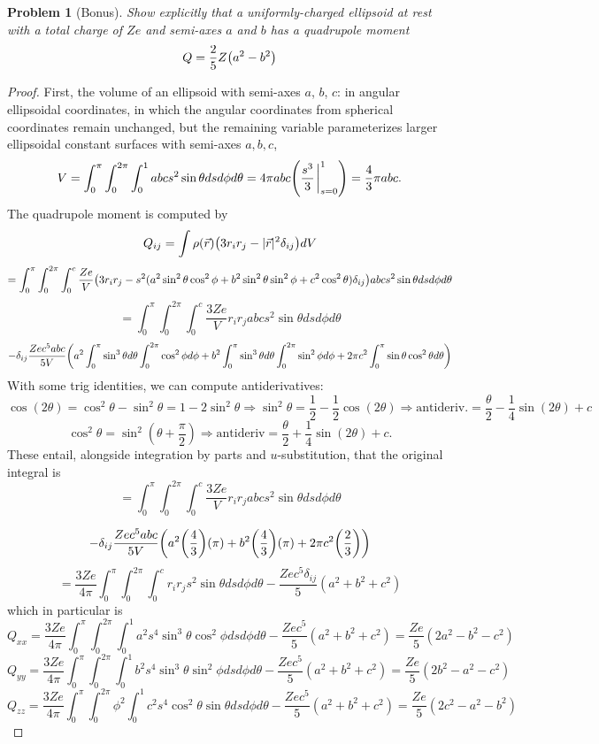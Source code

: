 \documentclass{article}
\newtheorem{plm}{Problem}
\begin{document}
\begin{plm}[Bonus]
  Show explicitly that a uniformly-charged ellipsoid at rest with a total charge of $Ze$ and semi-axes $a$ and $b$ has a quadrupole moment
  \[
    Q = \frac{2}{5}Z\qty(a^{2} - b^{2})
  \]
\end{plm}

\begin{proof}
  First, the volume of an ellipsoid with semi-axes $a$, $b$, $c$: in angular ellipsoidal coordinates,
  in which the angular coordinates from spherical coordinates remain unchanged,
  but the remaining variable parameterizes larger ellipsoidal constant surfaces with semi-axes $a, b, c$,
  \[
    V = \int_{0}^{\pi}\int_{0}^{2\pi}\int_{0}^{1}abcs^{2}\sin\theta dsd\phi d\theta
    = 4\pi abc\qty(\frac{s^{3}}{3}\eval_{s = 0}^{1}) = \frac{4}{3}\pi abc.
  \]
  The quadrupole moment is computed by
  \[
    Q_{ij} = \int \rho(\vec{r})\qty(3r_{i}r_{j} - |\vec{r}|^{2}\delta_{ij})dV
  \]
  \[
    = \int_{0}^{\pi}\int_{0}^{2\pi}\int_{0}^{c}\frac{Ze}{V}\qty(3r_{i}r_{j}
    - s^{2}(a^{2}\sin^{2}\theta\cos^{2}\phi + b^{2}\sin^{2}\theta\sin^{2}\phi
    + c^{2}\cos^{2}\theta)\delta_{ij})abcs^{2}\sin\theta dsd\phi d\theta
  \]
  \[
    = \int_{0}^{\pi}\int_{0}^{2\pi}\int_{0}^{c}\frac{3Ze}{V}r_{i}r_{j} abcs^{2}\sin\theta dsd\phi d\theta
  \]
  \[
    - \delta_{ij}\frac{Zec^{5}abc}{5V}\qty(a^{2}\int_{0}^{\pi}\sin^{3}\theta d\theta\int_{0}^{2\pi}\cos^{2}\phi d\phi
    + b^{2}\int_{0}^{\pi}\sin^{3}\theta d\theta\int_{0}^{2\pi}\sin^{2}\phi d\phi
    + 2\pi c^{2}\int_{0}^{\pi}\sin\theta\cos^{2}\theta d\theta)
  \]
  With some trig identities, we can compute antiderivatives:
  \[
    \cos(2\theta) = \cos^{2}\theta - \sin^{2}\theta = 1 - 2\sin^{2}\theta
    \Rightarrow \sin^{2}\theta = \frac{1}{2} - \frac{1}{2}\cos(2\theta)
    \Rightarrow \text{antideriv.} = \frac{\theta}{2} - \frac{1}{4}\sin(2\theta) + c
  \]
  \[
    \cos^{2}\theta = \sin^{2}(\theta + \frac{\pi}{2}) \Rightarrow \text{antideriv} = \frac{\theta}{2} + \frac{1}{4} \sin(2\theta)
    + c.
  \]
  These entail, alongside integration by parts and $u$-substitution, that the original integral is
  \[
    = \int_{0}^{\pi}\int_{0}^{2\pi}\int_{0}^{c}\frac{3Ze}{V}r_{i}r_{j}abcs^{2}\sin\theta dsd\phi d\theta
  \]

  \[
    - \delta_{ij}\frac{Zec^{5}abc}{5V}\qty(a^{2}\qty(\frac{4}{3})\qty(\pi)
    + b^{2}\qty(\frac{4}{3})(\pi) + 2\pi c^{2}\qty(\frac{2}{3}))
  \]
  \[
    = \frac{3Ze}{4\pi}\int_{0}^{\pi}\int_{0}^{2\pi}\int_{0}^{c}r_{i}r_{j}s^{2}\sin\theta dsd\phi d\theta
    - \frac{Zec^{5}\delta_{ij}}{5}(a^{2} + b^{2} + c^{2})
  \]
  which in particular is
  \[
    Q_{xx} = \frac{3Ze}{4\pi}\int_{0}^{\pi}\int_{0}^{2\pi}\int_{0}^{1}a^{2}s^{4}\sin^{3}\theta\cos^{2}\phi dsd\phi d\theta
    - \frac{Zec^{5}}{5}(a^{2} + b^{2} + c^{2})
    = \frac{Ze}{5}(2a^{2} - b^{2} - c^{2})
  \]
  \[
    Q_{yy} = \frac{3Ze}{4\pi}\int_{0}^{\pi}\int_{0}^{2\pi}\int_{0}^{1}b^{2}s^{4}\sin^{3}\theta \sin^{2}\phi dsd\phi d\theta
    - \frac{Zec^{5}}{5}(a^{2} + b^{2} + c^{2})
    = \frac{Ze}{5}(2b^{2} - a^{2} - c^{2})
  \]
  \[
    Q_{zz} = \frac{3Ze}{4\pi}\int_{0}^{\pi}\int_{0}^{2\pi}\phi^{2}\int_{0}^{1}c^{2}s^{4}\cos^{2}\theta \sin\theta ds d\phi d\theta
    - \frac{Zec^{5}}{5}(a^{2} + b^{2} + c^{2})
    = \frac{Ze}{5}(2c^{2} - a^{2} - b^{2})
  \]


\end{proof}
\end{document}
